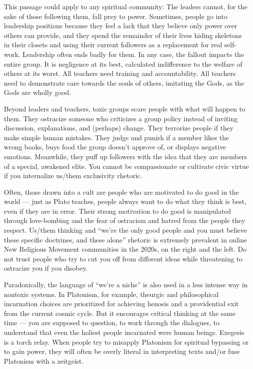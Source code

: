 \documentclass[
]{book}
\begin{document}
This passage could apply to any spiritual community: The leaders cannot, for the sake of those following them, fall prey to power. Sometimes, people go into leadership positions because they feel a lack that they believe only power over others can provide, and they spend the remainder of their lives hiding skeletons in their closets and using their current followers as a replacement for real self-work. Leadership often ends badly for them. In any case, the fallout impacts the entire group. It is negligence at its best, calculated indifference to the welfare of others at its worst. All teachers need training and accountability. All teachers need to demonstrate care towards the souls of others, imitating the Gods, as the Gods are wholly good.

Beyond leaders and teachers, toxic groups scare people with what will happen to them. They ostracize someone who criticizes a group policy instead of inviting discussion, explanations, and (perhaps) change. They terrorize people if they make simple human mistakes. They judge and punish if a member likes the wrong books, buys food the group doesn't approve of, or displays negative emotions. Meanwhile, they puff up followers with the idea that they are members of a special, awakened elite. You cannot be compassionate or cultivate civic virtue if you internalize us/them exclusivity rhetoric.

Often, those drawn into a cult are people who are motivated to do good in the world --- just as Plato teaches, people always want to do what they think is best, even if they are in error. Their strong motivation to do good is manipulated through love-bombing and the fear of ostracism and hatred from the people they respect. Us/them thinking and ``we're the only good people and you must believe these specific doctrines, and these alone'' rhetoric is extremely prevalent in online New Religious Movement communities in the 2020s, on the right and the left. Do not trust people who try to cut you off from different ideas while threatening to ostracize you if you disobey.

Paradoxically, the language of ``we're a niche'' is also used in a less intense way in nontoxic systems. In Platonism, for example, theurgic and philosophical incarnation choices are prioritized for achieving henosis and a providential exit from the current cosmic cycle. But it encourages critical thinking at the same time --- you are supposed to question, to work through the dialogues, to understand that even the holiest people incarnated were human beings. Exegesis is a torch relay. When people try to misapply Platonism for spiritual bypassing or to gain power, they will often be overly literal in interpreting texts and/or fuse Platonism with a zeitgeist.
\end{document}
